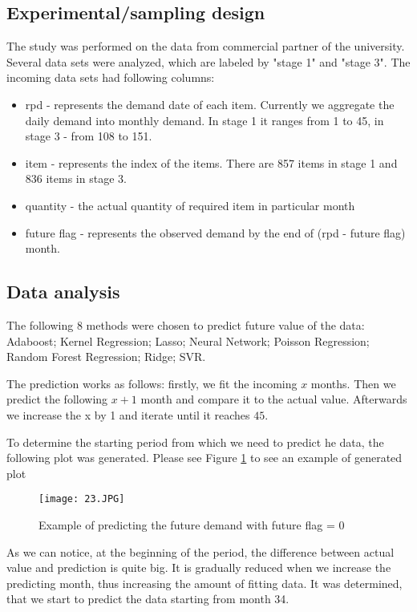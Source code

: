 \documentclass{article}
\begin{document}
\subsection{Experimental/sampling design}
The study was performed on the data from commercial partner of the university. Several data sets were analyzed, which are labeled by "stage 1" and "stage 3". 
The incoming data sets had following columns: 
\begin{itemize}
\item rpd - represents the demand date of each item. Currently we aggregate the daily demand into monthly demand. In stage 1 it ranges from 1 to 45, in stage 3 - from 108 to 151. 
\item item - represents the index of the items.  There are 857 items in stage 1 and 836 items in stage 3. 
\item quantity - the actual quantity of required item in particular month
\item future flag - represents the observed demand by the end of (rpd - future flag) month. 
\end{itemize}
\subsection{Data analysis}
The following 8 methods were chosen to predict future value of the data:  Adaboost; Kernel Regression; Lasso; Neural Network; Poisson Regression; Random Forest Regression; Ridge; SVR.

The prediction works as follows: firstly, we fit the incoming $x$ months. Then we predict the following $x+1$ month and compare it to the actual value. Afterwards we increase the x by 1 and iterate until it reaches $45$.

To determine the starting period from which we need to predict he data, the following plot was generated. Please see Figure \ref{fig:onee} to see an example of generated plot

\begin{figure}[h]
\texttt{[image: 23.JPG]}
\centering
\caption{Example of predicting the future demand with future flag = 0}
\label{fig:onee}
\end{figure}
As we can notice, at the beginning of the period, the difference between actual value and prediction is quite big. It is gradually reduced when we increase the predicting month, thus increasing the amount of fitting data. 
It was determined, that we start to predict the data starting from month 34.
\end{document}
